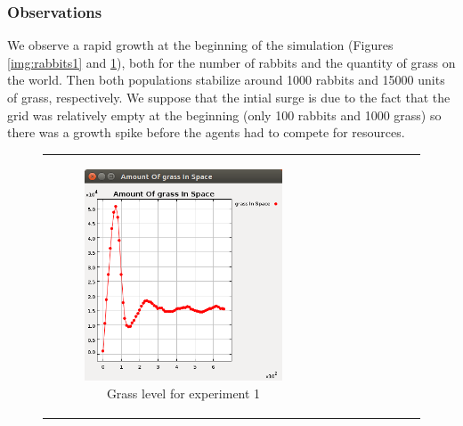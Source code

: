 \documentclass[11pt]{article}
\begin{document}
\subsubsection{Observations}
We observe a rapid growth at the beginning of the simulation (Figures \ref{img:rabbits1} and \ref{img:grass1}), both for the number of rabbits and the quantity of grass on the world. Then both populations stabilize around 1000 rabbits and 15000 units of grass, respectively. We suppose that the intial surge is due to the fact that the grid was relatively empty at the beginning (only 100 rabbits and 1000 grass) so there was a growth spike before the agents had to compete for resources.
\begin{figure}
    \begin{tabular}{c c c}
         \begin{subfigure}[b]{0.3\textwidth}
        \includegraphics[width=\textwidth]{experiment/1/Grass.png}
        \caption{\label{img:grass1} Grass level for experiment 1}
    \end{subfigure} & 
    \begin{subfigure}[b]{0.3\textwidth}

\end{subfigure}
\end{tabular}
\end{figure}
\end{document}
